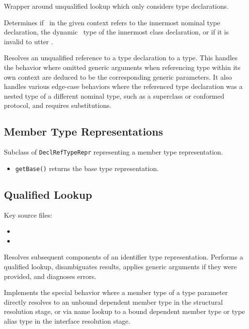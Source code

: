 \documentclass[../generics]{subfiles}
\begin{document}
Wrapper around unqualified lookup which only considers type declarations.

\IndexSelf
{}
Determines if \tSelf\ in the given context refers to the innermost nominal type declaration, the dynamic \tSelf\ type of the innermost class declaration, or if it is invalid to utter \tSelf.

Resolves an unqualified reference to a type declaration to a type. This handles the behavior where omitted generic arguments when referencing type within its own context are deduced to be the corresponding generic parameters. It also handles various edge-case behaviors where the referenced type declaration was a nested type of a different nominal type, such as a superclass or conformed protocol, and requires substitutions.

\subsection*{Member Type Representations}

Subclass of \texttt{DeclRefTypeRepr} representing a member type representation.
\begin{itemize}
\item \texttt{getBase()} returns the base type representation.
\end{itemize}

\subsection*{Qualified Lookup}

Key source files:
\begin{itemize}
\item {}
\item {}
\end{itemize}

Resolves subsequent components of an identifier type representation. Performs a qualified lookup, disambiguates results, applies generic arguments if they were provided, and diagnoses errors.

Implements the special behavior where a member type of a type parameter directly resolves to an unbound dependent member type in the structural resolution stage, or via name lookup to a bound dependent member type or type alias type in the interface resolution stage.
\end{document}
